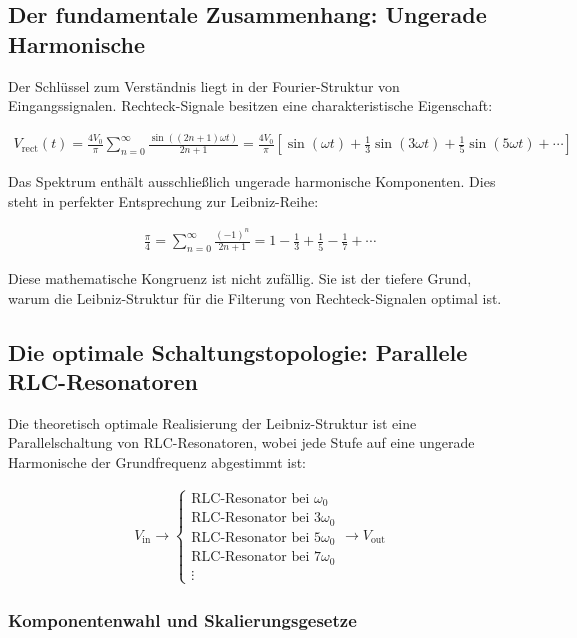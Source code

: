 \documentclass[a4paper,12pt,twoside]{report}
\theoremstyle{definition}
\begin{document}
\subsection{Der fundamentale Zusammenhang: Ungerade Harmonische}

Der Schlüssel zum Verständnis liegt in der Fourier-Struktur von Eingangssignalen. Rechteck-Signale besitzen eine charakteristische Eigenschaft:

\begin{align}
	V_{\text{rect}}(t) = \frac{4V_0}{\pi} \sum_{n=0}^{\infty} \frac{\sin((2n+1)\omega t)}{2n+1}
	= \frac{4V_0}{\pi} \left[ \sin(\omega t) + \frac{1}{3}\sin(3\omega t) + \frac{1}{5}\sin(5\omega t) + \cdots \right]
\end{align}

Das Spektrum enthält ausschließlich ungerade harmonische Komponenten. Dies steht in perfekter Entsprechung zur Leibniz-Reihe:

\begin{align}
	\frac{\pi}{4} = \sum_{n=0}^{\infty} \frac{(-1)^n}{2n+1} = 1 - \frac{1}{3} + \frac{1}{5} - \frac{1}{7} + \cdots
\end{align}

Diese mathematische Kongruenz ist nicht zufällig. Sie ist der tiefere Grund, warum die Leibniz-Struktur für die Filterung von Rechteck-Signalen optimal ist.

\subsection{Die optimale Schaltungstopologie: Parallele RLC-Resonatoren}

Die theoretisch optimale Realisierung der Leibniz-Struktur ist eine Parallelschaltung von RLC-Resonatoren, wobei jede Stufe auf eine ungerade Harmonische der Grundfrequenz abgestimmt ist:

\begin{align}
	V_{\text{in}} \longrightarrow \begin{cases}
		\text{RLC-Resonator bei } \omega_0 \\
		\text{RLC-Resonator bei } 3\omega_0 \\
		\text{RLC-Resonator bei } 5\omega_0 \\
		\text{RLC-Resonator bei } 7\omega_0 \\
		\vdots
	\end{cases} \longrightarrow V_{\text{out}}
\end{align}

\subsubsection*{Komponentenwahl und Skalierungsgesetze}
\end{document}

